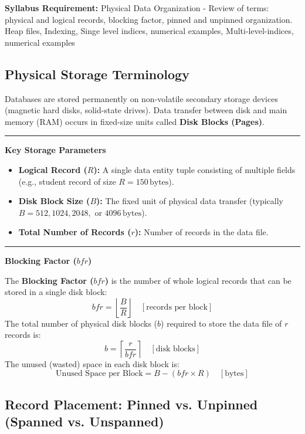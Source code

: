 \documentclass[11pt,a4paper]{article}
\newcommand{\concept}[1]{%
  \vspace{3pt}\noindent\textcolor{AnthGreen}{\rule{3.5pt}{10pt}}\enspace
  \textbf{\sffamily\color{AnthDark}#1}\par\vspace{2pt}%
}
\newcommand{\syllabusitem}[1]{%
  \begin{tcolorbox}[enhanced, colback=AnthOrange!8, colframe=AnthOrange, boxrule=0.4pt, arc=3pt, left=7pt, right=7pt, top=3pt, bottom=3pt]
    \small\sffamily\textbf{\color{AnthOrange}Syllabus Requirement:} #1
  \end{tcolorbox}
}
\begin{document}
\syllabusitem{Physical Data Organization - Review of terms: physical and logical records, blocking factor, pinned and unpinned organization. Heap files, Indexing, Singe level indices, numerical examples, Multi-level-indices, numerical examples}

\subsection{Physical Storage Terminology}

Databases are stored permanently on non-volatile secondary storage devices (magnetic hard disks, solid-state drives). Data transfer between disk and main memory (RAM) occurs in fixed-size units called \textbf{Disk Blocks (Pages)}.

\concept{Key Storage Parameters}
\begin{itemize}
  \item \textbf{Logical Record ($R$):} A single data entity tuple consisting of multiple fields (e.g., student record of size $R = 150\,\text{bytes}$).
  \item \textbf{Disk Block Size ($B$):} The fixed unit of physical data transfer (typically $B = 512, 1024, 2048,$ or $4096\,\text{bytes}$).
  \item \textbf{Total Number of Records ($r$):} Number of records in the data file.
\end{itemize}

\concept{Blocking Factor ($bfr$)}
The \textbf{Blocking Factor ($bfr$)} is the number of whole logical records that can be stored in a single disk block:
\begin{equation}
  bfr = \left\lfloor \frac{B}{R} \right\rfloor \quad [\text{records per block}]
\end{equation}
The total number of physical disk blocks ($b$) required to store the data file of $r$ records is:
\begin{equation}
  b = \left\lceil \frac{r}{bfr} \right\rceil \quad [\text{disk blocks}]
\end{equation}
The unused (wasted) space in each disk block is:
\begin{equation}
  \text{Unused Space per Block} = B - (bfr \times R) \quad [\text{bytes}]
\end{equation}

\subsection{Record Placement: Pinned vs. Unpinned (Spanned vs. Unspanned)}
\end{document}
